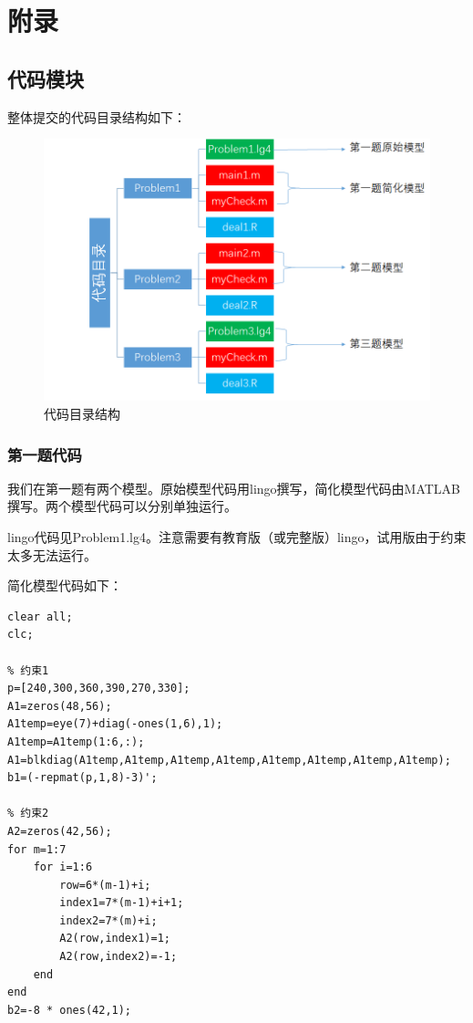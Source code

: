 \documentclass{ctexart}
\begin{document}
\section{附录}
{
    \subsection{代码模块}
    {
		整体提交的代码目录结构如下：
		
		\begin{figure}[H]
			\centering
			\includegraphics[width = 0.9\linewidth]{code.png}
			\caption{代码目录结构}
		\end{figure}
		
		\subsubsection{第一题代码}
		{
			我们在第一题有两个模型。原始模型代码用lingo撰写，简化模型代码由MATLAB撰写。两个模型代码可以分别单独运行。
			
			lingo代码见Problem1.lg4。注意需要有教育版（或完整版）lingo，试用版由于约束太多无法运行。
			
			简化模型代码如下：
			
			\begin{lstlisting}
clear all;
clc;

% 约束1
p=[240,300,360,390,270,330];
A1=zeros(48,56);
A1temp=eye(7)+diag(-ones(1,6),1);
A1temp=A1temp(1:6,:);
A1=blkdiag(A1temp,A1temp,A1temp,A1temp,A1temp,A1temp,A1temp,A1temp);
b1=(-repmat(p,1,8)-3)';

% 约束2
A2=zeros(42,56);
for m=1:7
    for i=1:6
        row=6*(m-1)+i;
        index1=7*(m-1)+i+1;
        index2=7*(m)+i;
        A2(row,index1)=1;
        A2(row,index2)=-1;
    end
end
b2=-8 * ones(42,1);


\end{lstlisting}}}}
\end{document}
